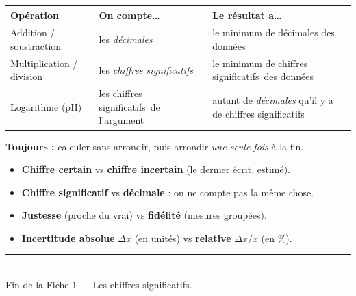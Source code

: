 \documentclass[11pt,a4paper]{article}
\newcommand{\CS}{chiffres significatifs}
\begin{document}
\begin{tcolorbox}[boxbase,colback=formulacol!6,colframe=formulacol,
   title={\textsc{Mémo — opérations}}]
\begin{center}\renewcommand{\arraystretch}{1.4}
\begin{tabular}{@{}>{\raggedright\arraybackslash}p{3.7cm} >{\raggedright\arraybackslash}p{3.5cm} >{\raggedright\arraybackslash}p{6.3cm}@{}}
\toprule
\textbf{Opération} & \textbf{On compte\dots} & \textbf{Le résultat a\dots}\\
\midrule
Addition / soustraction & les \emph{décimales} & le minimum de décimales des données\\
Multiplication / division & les \emph{\CS} & le minimum de \CS\ des données\\
Logarithme ($\mathrm{pH}$) & les \CS\ de l'argument & autant de \emph{décimales} qu'il y a de \CS\\
\bottomrule
\end{tabular}
\end{center}
\textbf{Toujours :} calculer sans arrondir, puis arrondir \emph{une seule fois} à la fin.
\end{tcolorbox}

\begin{tcolorbox}[boxbase,colback=defcol!5,colframe=defcol,
   title={\textsc{Mémo — vocabulaire à ne pas confondre}}]
\begin{itemize}[leftmargin=1.6em,topsep=2pt,itemsep=1.5pt]
  \item \textbf{Chiffre certain} vs \textbf{chiffre incertain} (le dernier écrit, estimé).
  \item \textbf{Chiffre significatif} vs \textbf{décimale} : on ne compte pas la même chose.
  \item \textbf{Justesse} (proche du vrai) vs \textbf{fidélité} (mesures groupées).
  \item \textbf{Incertitude absolue} $\Delta x$ (en unités) vs \textbf{relative} $\Delta x/x$ (en \%).
\end{itemize}
\end{tcolorbox}

\vfill
\begin{center}
\textcolor{primary}{\rule{0.5\textwidth}{1pt}}\\[4pt]
{\small\color{black!60}Fin de la Fiche 1 — Les chiffres significatifs.}
\end{center}
\end{document}
